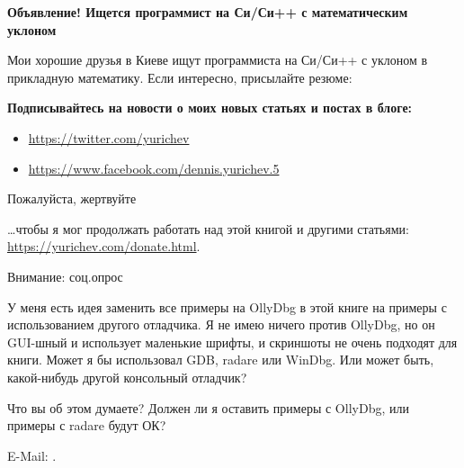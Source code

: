 \vspace*{\fill}

\vspace*{\fill}

\normalsize \textbf{Объявление! Ищется программист на Си/Си++ с математическим уклоном}

\bigskip
\bigskip
\bigskip

Мои хорошие друзья в Киеве ищут программиста на Си/Си++ с уклоном в прикладную математику.
Если интересно, присылайте резюме: 

\bigskip
\bigskip
\bigskip

\normalsize \textbf{Подписывайтесь на новости о моих новых статьях и постах в блоге:}

\bigskip
\bigskip
\bigskip

\begin{itemize}

\item \url{https://twitter.com/yurichev}

\item \url{https://www.facebook.com/dennis.yurichev.5}

\end{itemize}

\bigskip
\bigskip
\bigskip
\huge Пожалуйста, жертвуйте
\normalsize

\bigskip
\bigskip
\bigskip

\dots чтобы я мог продолжать работать над этой книгой и другими статьями: \\
\url{https://yurichev.com/donate.html}.

\bigskip
\bigskip
\bigskip

\huge Внимание: соц.опрос
\normalsize

\bigskip
\bigskip
\bigskip

У меня есть идея заменить все примеры на OllyDbg в этой книге на примеры с использованием другого отладчика.
Я не имею ничего против OllyDbg, но он GUI-шный и использует маленькие шрифты, и скриншоты не очень подходят для книги.
Может я бы использовал GDB, radare или WinDbg.
Или может быть, какой-нибудь другой консольный отладчик?

Что вы об этом думаете?
Должен ли я оставить примеры с OllyDbg, или примеры с radare будут ОК?

E-Mail: \GTT{\EMAIL}.

\vspace*{\fill}
\vfill
